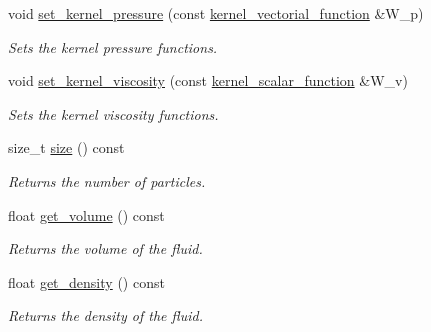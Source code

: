\begin{DoxyCompactItemize}
void \hyperlink{classphysim_1_1fluids_1_1fluid_ad7cbaf969b9c5e4c75606e2f84b81e69}{set\+\_\+kernel\+\_\+pressure} (const \hyperlink{namespacephysim_1_1fluids_ab109a55050c62abe9c1c23924f620754}{kernel\+\_\+vectorial\+\_\+function} \&W\+\_\+p)
\begin{DoxyCompactList}\small\item\em Sets the kernel pressure functions. \end{DoxyCompactList}\item 
void \hyperlink{classphysim_1_1fluids_1_1fluid_a57d90a54268e6c204e0173f81a678dd6}{set\+\_\+kernel\+\_\+viscosity} (const \hyperlink{namespacephysim_1_1fluids_a22c55c76ab3fe3de79dada15e2f9c2d6}{kernel\+\_\+scalar\+\_\+function} \&W\+\_\+v)
\begin{DoxyCompactList}\small\item\em Sets the kernel viscosity functions. \end{DoxyCompactList}\item 
\mbox{\label{classphysim_1_1fluids_1_1fluid_afd3bc254d3c033f42dabd68140b3462f}} 
size\+\_\+t \hyperlink{classphysim_1_1fluids_1_1fluid_afd3bc254d3c033f42dabd68140b3462f}{size} () const
\begin{DoxyCompactList}\small\item\em Returns the number of particles. \end{DoxyCompactList}\item 
\mbox{\label{classphysim_1_1fluids_1_1fluid_a5edae508eb8eec257c53dc2f333b5e4d}} 
float \hyperlink{classphysim_1_1fluids_1_1fluid_a5edae508eb8eec257c53dc2f333b5e4d}{get\+\_\+volume} () const
\begin{DoxyCompactList}\small\item\em Returns the volume of the fluid. \end{DoxyCompactList}\item 
\mbox{\label{classphysim_1_1fluids_1_1fluid_a8dbe0c4575e0308c70d0544cf0741cc6}} 
float \hyperlink{classphysim_1_1fluids_1_1fluid_a8dbe0c4575e0308c70d0544cf0741cc6}{get\+\_\+density} () const
\begin{DoxyCompactList}\small\item\em Returns the density of the fluid. \end{DoxyCompactList}\item 
\mbox{\label{classphysim_1_1fluids_1_1fluid_a047fcfcc2df0d02e3c2bb2ae50659e21}} 

\end{DoxyCompactItemize}

